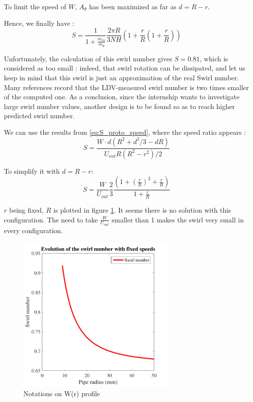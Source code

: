 To limit the speed of $W$, $A_{\theta}$ has been maximized as far as $d=R-r$.

Hence, we finally have :
\begin{equation}
S=\frac{1}{1+\frac{\dot{m_{in}}}{\dot{m_{\theta}}}}\frac{2 \pi R}{3NH}(1+\frac{r}{R}(1+\frac{r}{R}))
\end{equation}


Unfortunately, the calculation of this swirl number gives $S=0.81$, which is considered as too small : indeed, that swirl rotation can be dissipated, and let us keep in mind that this swirl is just an approximation of the real Swirl number. Many references record that the LDV-measured swirl number is two times smaller of the computed one. As a conclusion, since the internship wants to investigate large swirl number values, another design is to be found so as to reach higher predicted swirl number.

We can use the results from \ref{eq:S_proto_speed}, where the speed ratio appears :
\begin{equation}
S=\frac{W \cdot d (R^2+d^2/3-dR)}{U_{out}R(R^2-r^2)/2}
\end{equation}


To simplify it with $d=R-r$:
\begin{equation}
S=\frac{W}{U_{out}}\frac{2}{3}\frac{(1+(\frac{r}{R})^2+\frac{r}{R})}{1+\frac{r}{R}}
\end{equation}


$r$ being fixed, $R$ is plotted in figure \ref{proto_plot}. It seems there is no solution with this configuration. The need to take $\frac{W}{U_{out}}$ smaller than 1 makes the swirl very small in every configuration.


\begin{figure}[h!]
  \centering
\includegraphics[width=0.7\textwidth]{fig/Proto_burner_Swirl.pdf}
  \caption{Notations on W(r) profile}
 \label{proto_plot}
\end{figure}



